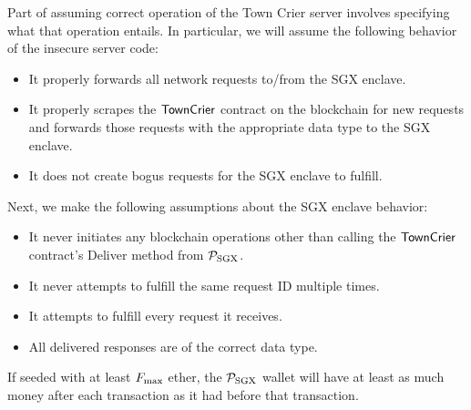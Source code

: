 Part of assuming correct operation of the Town Crier server involves specifying what that operation entails.
In particular, we will assume the following behavior of the insecure server code:
\begin{itemize}
  \item It properly forwards all network requests to/from the SGX enclave.
  \item It properly scrapes the ${\sf TownCrier}$ contract on the blockchain for new requests and forwards those requests with the appropriate data type to the SGX enclave.
  \item It does not create bogus requests for the SGX enclave to fulfill.
\end{itemize}
Next, we make the following assumptions about the SGX enclave behavior:
\begin{itemize}
  \item It never initiates any blockchain operations other than calling the ${\sf TownCrier}$ contract's Deliver method from $\mathcal{P}_{\rm SGX}$.
  \item It never attempts to fulfill the same request ID multiple times.
  \item It attempts to fulfill every request it receives.
  \item All delivered responses are of the correct data type.
\end{itemize}

\begin{lemma} \label{0:non-bankrupt-adf}
If seeded with at least $F_{\rm max}$ ether, the $\mathcal{P}_{\rm SGX}$ wallet will have
at least as much money after each transaction as it had before that transaction.
\end{lemma}

